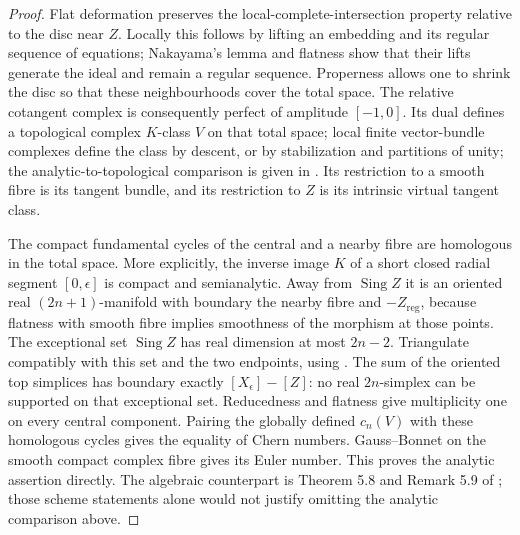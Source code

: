 \begin{proof}
Flat deformation preserves the local-complete-intersection
property relative to the disc near $Z$. Locally this follows by
lifting an embedding and its regular sequence of equations;
Nakayama's lemma and flatness show that their lifts generate
the ideal and remain a regular sequence. Properness allows one
to shrink the disc so that these neighbourhoods cover the total
space. The relative cotangent complex is consequently perfect
of amplitude $[-1,0]$. Its dual defines a topological complex
$K$-class $V$ on that total space; local finite vector-bundle
complexes define the class by descent, or by stabilization and
partitions of unity; the analytic-to-topological comparison is
given in \cite[Lemmas 3.1--3.2 and Section 3.1]{Levy08}.
Its restriction to a smooth fibre is its
tangent bundle, and its restriction to $Z$ is its intrinsic
virtual tangent class.

The compact fundamental cycles of the central and a nearby
fibre are homologous in the total space. More explicitly,
the inverse image $K$ of a short closed radial segment
$[0,\epsilon]$ is compact and semianalytic. Away from
$\operatorname{Sing}Z$ it is an oriented real
$(2n+1)$-manifold with boundary the nearby fibre and
$-Z_{\mathrm{reg}}$, because flatness with smooth fibre
implies smoothness of the morphism at those points.
The exceptional set $\operatorname{Sing}Z$ has real
dimension at most $2n-2$. Triangulate compatibly with
this set and the two endpoints, using
\cite[Section 3, Theorems 1--2]{Loj64}. The sum of the
oriented top simplices has boundary exactly
$[X_\epsilon]-[Z]$: no real $2n$-simplex can be supported
on that exceptional set. Reducedness and flatness give
multiplicity one on every central component. Pairing the globally defined
$c_n(V)$ with these homologous cycles gives the equality of
Chern numbers. Gauss--Bonnet on the smooth compact complex
fibre gives its Euler number. This proves the analytic assertion
directly. The algebraic counterpart is Theorem 5.8 and
Remark 5.9 of \cite{FG10}; those scheme statements alone would
not justify omitting the analytic comparison above.
\end{proof}

